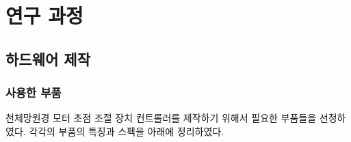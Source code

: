 \section{연구 과정}

\subsection{하드웨어 제작}

\subsubsection{사용한 부품}


천체망원경 모터 초점 조절 장치 컨트롤러를 제작하기 위해서 필요한 부품들을 선정하였다. 각각의 부품의 특징과 스펙을 아래에 정리하였다. 

